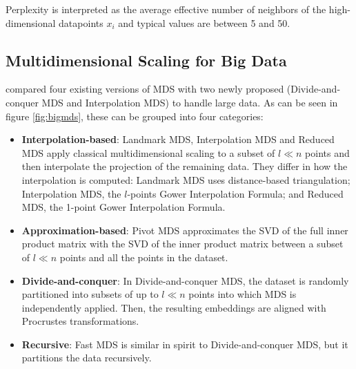 Perplexity is interpreted as the average effective number of neighbors of the high-dimensional datapoints $x_i$ and typical values are between 5 and 50.

\subsection{Multidimensional Scaling for Big Data}

\cite{Delicado2024} compared four existing versions of MDS with two newly proposed (Divide-and-conquer MDS and Interpolation MDS) to handle large data. As can be seen in figure \ref{fig:bigmds}, these can be grouped into four categories:

\begin{itemize}
    \item \textbf{Interpolation-based}: Landmark MDS, Interpolation MDS and Reduced MDS apply classical multidimensional scaling to a subset of $l \ll n$ points and then interpolate the projection of the remaining data. They differ in how the interpolation is computed: Landmark MDS uses distance-based triangulation; Interpolation MDS, the $l$-points Gower Interpolation Formula; and Reduced MDS, the 1-point Gower Interpolation Formula.
    \item \textbf{Approximation-based}: Pivot MDS approximates the SVD of the full inner product matrix with the SVD of the inner product matrix between a subset of $l \ll n$ points and all the points in the dataset.
    \item \textbf{Divide-and-conquer}: In Divide-and-conquer MDS, the dataset is randomly partitioned into subsets of up to $l \ll n$ points into which MDS is independently applied. Then, the resulting embeddings are aligned with Procrustes transformations.
    \item \textbf{Recursive}: Fast MDS is similar in spirit to Divide-and-conquer MDS, but it partitions the data recursively. 
\end{itemize}

